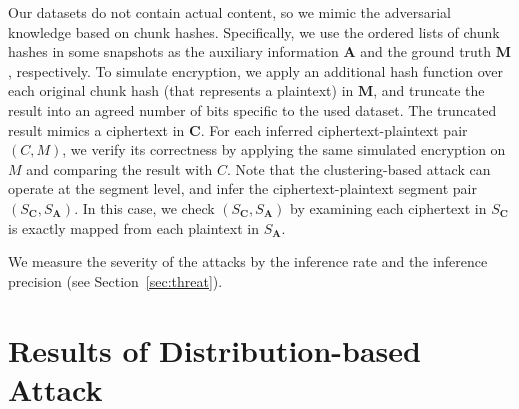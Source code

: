 Our datasets do not contain actual content, so we mimic the adversarial
knowledge based on chunk hashes. Specifically, we use the ordered lists of
chunk hashes in some snapshots as the auxiliary information $\mathbf{A}$ and
the ground truth $\mathbf{M}$, respectively. To simulate encryption, we apply
an additional hash function over each original chunk hash (that represents a
plaintext) in $\mathbf{M}$, and truncate the result into an agreed number of
bits specific to the used dataset. The truncated result mimics a ciphertext in
$\mathbf{C}$. For each inferred ciphertext-plaintext pair $(C, M)$, we verify
its correctness by applying the same simulated encryption on $M$ and comparing
the result with $C$. Note that the clustering-based attack can operate at the
segment level, and infer the ciphertext-plaintext segment pair $(S_\mathbf{C},
S_\mathbf{A})$.  In this case, we check $(S_\mathbf{C}, S_\mathbf{A})$ by
examining each ciphertext in $S_\mathbf{C}$ is exactly mapped from each
plaintext in $S_\mathbf{A}$.


We measure the severity of the attacks by the inference rate and the inference
precision (see Section~\ref{sec:threat}). 

\section{Results of Distribution-based Attack}
\label{sec:experiment-distribution}

